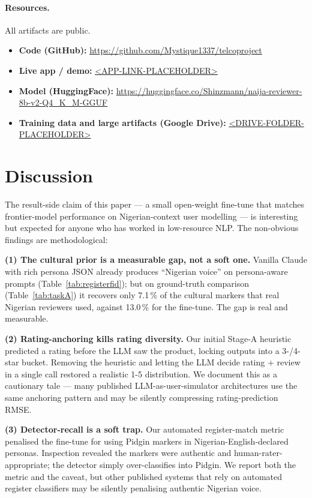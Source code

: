\documentclass[sigconf,nonacm,balance]{acmart}
\begin{document}
\paragraph{Resources.} All artifacts are public.
\begin{itemize}[leftmargin=*,nosep]
  \item \textbf{Code (GitHub):} \url{https://github.com/Mystique1337/telcoproject}
  \item \textbf{Live app / demo:} \url{<APP-LINK-PLACEHOLDER>} %
  \item \textbf{Model (HuggingFace):}
        \url{https://huggingface.co/Shinzmann/naija-reviewer-8b-v2-Q4_K_M-GGUF}
  \item \textbf{Training data and large artifacts (Google Drive):}
        \url{<DRIVE-FOLDER-PLACEHOLDER>} %
\end{itemize}

\section{Discussion}
\label{sec:discussion}

The result-side claim of this paper --- a small open-weight fine-tune
that matches frontier-model performance on Nigerian-context user
modelling --- is interesting but expected for anyone who has worked in
low-resource NLP. The non-obvious findings are methodological:

\textbf{(1) The cultural prior is a measurable gap, not a soft one.}
Vanilla Claude with rich persona JSON already produces ``Nigerian
voice'' on persona-aware prompts (Table~\ref{tab:registerfid}); but on
ground-truth comparison (Table~\ref{tab:taskA}) it recovers only
7.1\,\% of the cultural markers that real Nigerian reviewers used,
against 13.0\,\% for the fine-tune. The gap is real and measurable.

\textbf{(2) Rating-anchoring kills rating diversity.} Our initial
Stage-A heuristic predicted a rating before the LLM saw the product,
locking outputs into a 3-/4-star bucket. Removing the heuristic and
letting the LLM decide rating + review in a single call restored a
realistic 1-5 distribution. We document this as a cautionary tale ---
many published LLM-as-user-simulator architectures use the same
anchoring pattern and may be silently compressing rating-prediction
RMSE.

\textbf{(3) Detector-recall is a soft trap.} Our automated
register-match metric penalised the fine-tune for using Pidgin markers
in Nigerian-English-declared personas. Inspection revealed the markers
were authentic and human-rater-appropriate; the detector simply
over-classifies into Pidgin. We report both the metric and the caveat,
but other published systems that rely on automated register
classifiers may be silently penalising authentic Nigerian voice.
\end{document}
